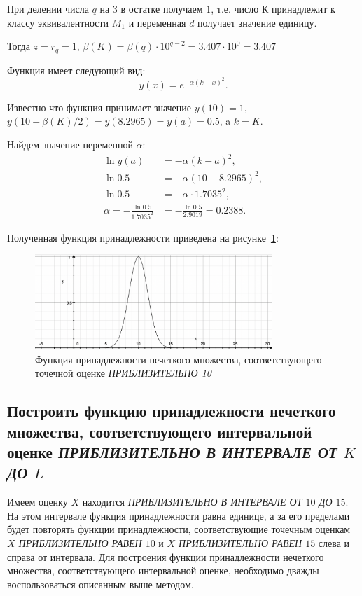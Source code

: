При делении числа $q$ на $3$ в остатке получаем $1$, т.е. число $К$ принадлежит к классу эквивалентности $M_1$ и переменная $d$ получает значение единицу. 

Тогда $z=r_q=1$, $\beta(K) = \beta(q)\cdot 10^{q-2} = 3.407 \cdot 10^0 = 3.407$

Функция имеет следующий вид:
\[
	y(x) = e^{-\alpha(k-x)^2}.
\]

Известно что функция принимает значение $y(10)=1$, $y(10-\beta(K)/2)=y(8.2965)=y(a)=0.5$, a $k = K$.

Найдем значение переменной $\alpha$:
\begin{align*}
	\ln y(a) &= -\alpha(k - a)^2, \\
	\ln 0.5 &= -\alpha(10 - 8.2965)^2, \\
	\ln 0.5 &= -\alpha \cdot 1.7035^2, \\
	\alpha = - \frac{\ln 0.5}{1.7035^2} &= - \frac{\ln 0.5}{2.9019} = 0.2388.
\end{align*}

Полученная функция принадлежности приведена на рисунке~\ref{fig:graph1}:

\begin{figure}[H]
	\centering
	  \includegraphics[width=0.8\textwidth]{graph1}
	\caption{Функция принадлежности нечеткого множества, соответствующего точечной оценке \textit{ПРИБЛИЗИТЕЛЬНО 10}}
	\label{fig:graph1}
  \end{figure}

\subsection{Построить функцию принадлежности нечеткого множества, соответствующего интервальной оценке \textit{ПРИБЛИЗИТЕЛЬНО В ИНТЕРВАЛЕ ОТ $K$ ДО $L$}}

Имеем оценку $X$ находится \textit{ПРИБЛИЗИТЕЛЬНО В ИНТЕРВАЛЕ ОТ $10$ ДО $15$}. 
На этом интервале функция принадлежности равна единице, а за его пределами будет повторять функции принадлежности, соответствующие точечным оценкам \textit{$X$ ПРИБЛИЗИТЕЛЬНО РАВЕН $10$} и \textit{$X$ ПРИБЛИЗИТЕЛЬНО РАВЕН $15$} слева и справа от интервала. Для построения функции принадлежности нечеткого множества, соответствующего интервальной оценке, необходимо дважды воспользоваться описанным выше методом.

